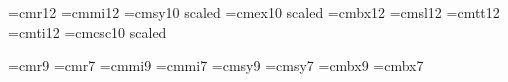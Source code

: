  
\ifx\tenpoint\undefined\let\loadedfrommacro=Y
         
         \let\loadedfrommacro=N\fi
 
\font\twelverm=cmr12
\font\twelvei=cmmi12
\font\twelvesy=cmsy10 scaled 
\font\twelveex=cmex10 scaled 
\font\twelvebf=cmbx12
\font\twelvesl=cmsl12
\font\twelvett=cmtt12
\font\twelveit=cmti12
\font\twelvecsc=cmcsc10 scaled 
 
\font\ninerm=cmr9            \font\sevenrm=cmr7
\font\ninei=cmmi9            \font\seveni=cmmi7
\font\ninesy=cmsy9           \font\sevensy=cmsy7
\font\ninebf=cmbx9           \font\sevenbf=cmbx7
 
\ifx\twelvepoint\undefined
   \def\twelvepoint{\def\rm{\fam0\twelverm}%
       \textfont0=\twelverm \scriptfont0=\ninerm \scriptscriptfont0=\sevenrm
       \textfont1=\twelvei  \scriptfont1=\ninei  \scriptscriptfont1=\seveni
       \textfont2=\twelvesy \scriptfont2=\ninesy \scriptscriptfont2=\sevensy
       \textfont3=\twelveex \scriptfont3=\twelveex\scriptscriptfont3=\twelveex
       \textfont\itfam=\twelveit  \def\it{\fam\itfam\twelveit}%
       \textfont\slfam=\twelvesl  \def\sl{\fam\slfam\twelvesl}%
       \textfont\ttfam=\twelvett  \def\tt{\fam\ttfam\twelvett}%
       \textfont\bffam=\twelvebf  \scriptfont\bffam=\ninebf
        \scriptscriptfont\bffam=\sevenbf  \def\bf{\fam\bffam\twelvebf}%
       \textfont\scfam=\twelvecsc \def\sc{\fam\scfam\twelvecsc}%
       \normalbaselineskip=14pt
       \setbox\strutbox=\hbox{\vrule height9.5pt depth4.5pt width0pt}%
       \normalbaselines\rm}
   \fi
